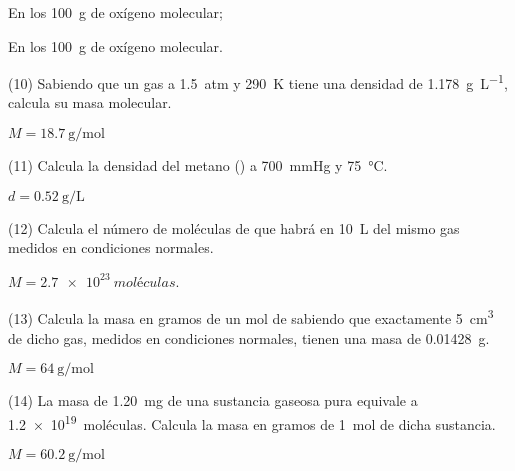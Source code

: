 \documentclass[10pt]{article}
\begin{document}
\begin{multicols}{2}
\begin{solution}
  \begin{enumerate*}
    \item En los \SI{100}{\gram} de oxígeno molecular;
    \item En los \SI{100}{\gram} de oxígeno molecular.
  \end{enumerate*}
\end{solution}

\begin{exercise}
  (10) Sabiendo que un gas a \SI{1,5}{atm} y \SI{290}{\kelvin} tiene una densidad de \SI{1,178}{\gram\per\liter}, calcula su masa molecular.
\end{exercise}
\begin{solution}
  \( M = \SI{18,7}{\gram\per\mole} \)
\end{solution}

\begin{exercise}
  (11) Calcula la densidad del metano () a \SI{700}{\mmHg} y \SI{75}{\celsius}.
\end{exercise}
\begin{solution}
  \( d = \SI{0,52}{\gram\per\liter} \)
\end{solution}

\begin{exercise}
  (12) Calcula el número de moléculas de  que habrá en \SI{10}{\liter} del mismo gas medidos en condiciones normales.
\end{exercise}

\begin{solution}
  \( M = \SI{2,7e23}{moléculas} \).
\end{solution}

\begin{exercise}
  (13) Calcula la masa en gramos de un mol de  sabiendo que
  exactamente \SI{5}{\cubic\centi\meter} de dicho gas, medidos en condiciones
  normales, tienen una masa de \SI{0,01428}{\gram}.
\end{exercise}
\begin{solution}
  \( M = \SI{64}{\gram\per\mole} \)
\end{solution}

\begin{exercise}
  (14) La masa de \SI{1,20}{\milli\gram} de una sustancia gaseosa pura equivale
  a \SI{1,2e19}{moléculas}. Calcula la masa en gramos de \SI{1}{\mole} de dicha sustancia.
\end{exercise}
\begin{solution}
  \( M = \SI{60,2}{\gram\per\mole} \)
\end{solution}


\end{multicols}
\end{document}
